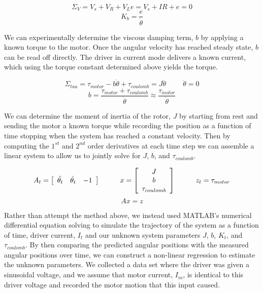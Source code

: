 \documentclass{article}
\theoremstyle{plain}
\theoremstyle{definition}
\theoremstyle{remark}
\begin{document}
$$ \Sigma_{V} = V_{s} + V_{R} + V_{L} e = V_{s} + IR + e = 0 $$
$$ K_b = \frac{e}{\dot{\theta}} $$

%
%

We can experimentally determine the viscous damping term, $b$ by applying a known torque to the motor.  Once the angular velocity has reached steady state, $b$ can be read off directly.  The driver in current mode delivers a known current, which using the torque constant determined above yields the torque.  

$$ \Sigma_{tau} = \tau_{motor} - b\dot{\theta} + \tau_{coulomb} = J \ddot{\theta} \hspace{1cm} \ddot{\theta} = 0 $$
$$ b = \frac{\tau_{motor} + \tau_{coulomb}}{\dot{\theta}} \approx \frac{\tau_{motor}}{\dot{\theta}}$$

We can determine the moment of inertia of the rotor, $J$ by starting from rest and sending the motor a known torque while recording the position as a function of time stopping when the system has reached a constant velocity.  Then by computing the $1^{st}$ and $2^{nd}$ order derivatives at each time step we can assemble a linear system to allow us to jointly solve for $J$, $b$, and $\tau_{coulomb}$.

$$ A_{t} = \left[ \begin{array}{c c c} \ddot{\theta_{t}} & \dot{\theta_{t}} & -1 \end{array} \right]  \hspace{1cm} 
x = \left[ \begin{array}{c} J \\ b \\ \tau_{coulomb} \end{array} \right] \hspace{1cm} z_{t} = \tau_{motor} $$
$$ Ax = z $$

Rather than attempt the method above, we instead used MATLAB's numerical differential equation solving to simulate the trajectory of the system as a function of time, driver current, $I_t$ and our unknown system parameters $J$, $b$, $K_t$, and $\tau_{coulomb}$.  By then
comparing the predicted angular positions with the measured angular positions over time, we can construct a non-linear regression to estimate the unknown parameters.  We collected a data set where the driver was given a sinusoidal voltage, and we assume that motor current, $I_m$, is identical to this driver voltage and recorded the motor motion that this input caused. \\
\end{document}
